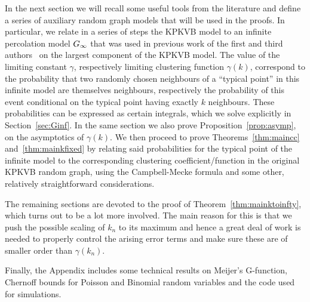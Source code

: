 In the next section we will recall some useful tools from the literature and define a series of auxiliary random graph models that will be used in the proofs. In particular, we relate in a series of steps the KPKVB model to an infinite percolation model $G_{\infty}$ that was used in previous work of the first and third authors~\cite{fountoulakis2018law} on the largest component of the KPKVB model. The value of the limiting constant $\gamma$, respectively limiting clustering function $\gamma(k)$, correspond to the probability that two randomly chosen neighbours of a ``typical point'' in this infinite model are themselves neighbours, respectively the probability of this event conditional on the typical point having exactly $k$ neighbours. These probabilities can be expressed as certain integrals, which we solve explicitly in Section~\ref{sec:Ginf}. 
In the same section we also prove Proposition~\ref{prop:asymp}, on the asymptotics of $\gamma(k)$. We then proceed to prove Theorems~\ref{thm:maincc} and~\ref{thm:mainkfixed} by relating said probabilities for the typical point of the infinite model to the corresponding clustering coefficient/function in the original KPKVB random graph, using the Campbell-Mecke formula and some other, relatively straightforward considerations.

The remaining sections are devoted to the proof of Theorem~\ref{thm:mainktoinfty}, which turns out to be a lot more involved. The main reason for this is that we push the possible scaling of $k_n$ to its maximum and hence a great deal of work is needed to properly control the arising error terms and make sure these are of smaller order than $\gamma(k_n)$. 

Finally, the Appendix includes some technical results on Meijer's G-function, Chernoff bounds for Poisson and Binomial random variables and the code used for simulations.

